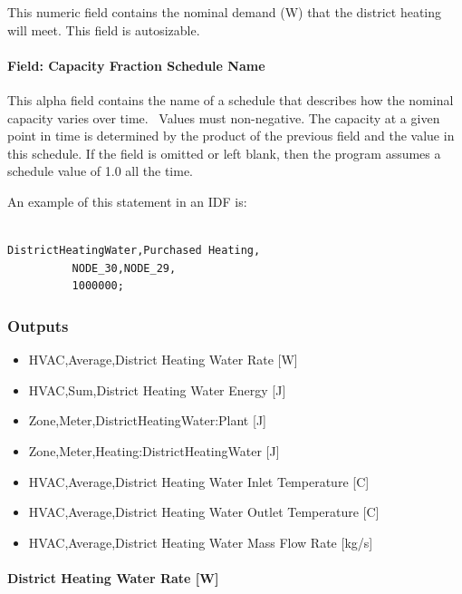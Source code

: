 This numeric field contains the nominal demand (W) that the district heating will meet. This field is autosizable.

\paragraph{Field: Capacity Fraction Schedule Name}\label{field-capacity-fraction-schedule-name-1}

This alpha field contains the name of a schedule that describes how the nominal capacity varies over time.~ Values must non-negative. The capacity at a given point in time is determined by the product of the previous field and the value in this schedule. If the field is omitted or left blank, then the program assumes a schedule value of 1.0 all the time.

An example of this statement in an IDF is:

\begin{lstlisting}

DistrictHeatingWater,Purchased Heating,
          NODE_30,NODE_29,
          1000000;
\end{lstlisting}

\subsubsection{Outputs}\label{outputs-15-002}

\begin{itemize}
    \item
    HVAC,Average,District Heating Water Rate {[}W{]}
    \item
    HVAC,Sum,District Heating Water Energy {[}J{]}
    \item
    Zone,Meter,DistrictHeatingWater:Plant {[}J{]}
    \item
    Zone,Meter,Heating:DistrictHeatingWater {[}J{]}
    \item
    HVAC,Average,District Heating Water Inlet Temperature {[}C{]}
    \item
    HVAC,Average,District Heating Water Outlet Temperature {[}C{]}
    \item
    HVAC,Average,District Heating Water Mass Flow Rate {[}kg/s{]}
\end{itemize}

\paragraph{District Heating Water Rate {[}W{]}}\label{district-heating-hot-water-rate-w}

